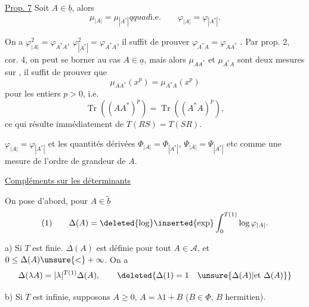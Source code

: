 \uline{Prop. 7} Soit $A\in\underline b$, alors
\margin{$\Big|$}
\[
\mu_{|A|}=\mu_{|A^*|}qquad\text{i.e.}\qquad
\varphi_{|A|}=\varphi_{|A^*|}.
\]

On a $\varphi_{|A|}^{2}=\varphi_{A^*A}$, $\varphi_{|A^*|}^{2}=\varphi_{A^*A}$, il suffit de prouver $\varphi_{A^*A}=\varphi_{AA^*}$  . Par prop. 2, cor. 4, on peut se borner au cas $A\in\underline a$, mais alors  $\mu_{AA^*}$ et $\mu_{A^*A}$ sont deux mesures   sur \deleted{$[0,+\infty[$} , il suffit de prouver que
\[
\mu_{AA^*}(x^p)=\mu_{A^*A}(x^p)
\]
pour les entiers $p>0$, i.e.
\[
\operatorname{Tr}((AA^*)^p)=\operatorname{Tr}((A^*A)^p),
\]
ce qui résulte immédiatement de $T(RS)=T(SR)$.

$\varphi_{|A|}=\varphi_{|A^*|}$ et les quantités dérivées
$\Phi_{|A|}=\Phi_{|A^*|}$, $\Psi_{|A|}=\Psi_{|A^*|}$ etc    comme une mesure de l'ordre de grandeur de $A$.

\quad\uline{Compléments sur les déterminants}

 On pose  d'abord, pour $A\in\widetilde{\underline b}$
\[
(1)\qquad\Delta(A)=\deleted{\log}\inserted{\exp}\int_0^{T(1)}\log\varphi_{|A|}.
\]
  

a) Si $T$ est finie. $\Delta(A)$ est définie pour tout $A\in\mathcal A$, et $0\leq\Delta(A)\unsure{<}+\infty$. On a
\[
\Delta(\lambda A)=|\lambda|^{T(1)}\Delta(A),
\qquad\deleted{\Delta(1)=1\quad\unsure{\Delta(A)|\text{et }\Delta(A)}}
\]

b) Si $T$ est infinie, supposons $A\geq0$, $A=\lambda1+B$ ($B\in\underline\Phi$, $B$ hermitien). 
